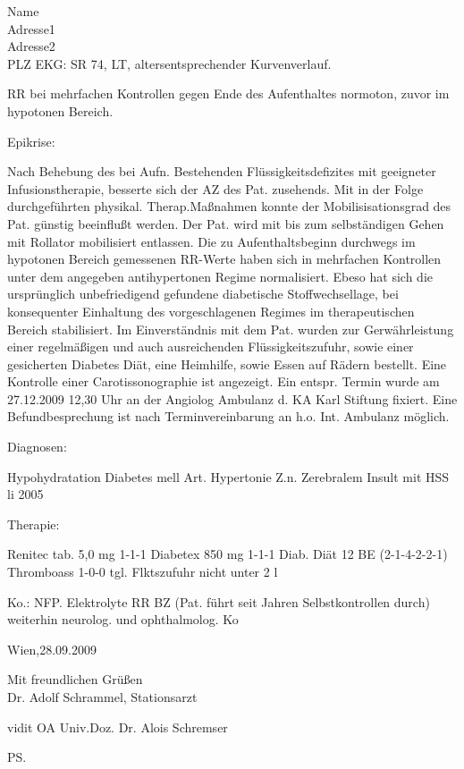 \documentclass[fromalign=center,fromrule=aftername,fromphone,fromemail,fontsize=10pt,DIV=13]{scrlttr2}
\begin{document}
\begin{letter}{Name\\
Adresse1\\
Adresse2\\
PLZ}
EKG: SR 74, LT, altersentsprechender Kurvenverlauf.

RR bei mehrfachen Kontrollen gegen Ende des Aufenthaltes normoton, zuvor im hypotonen Bereich.

Epikrise:

Nach Behebung des bei Aufn. Bestehenden Flüssigkeitsdefizites mit geeigneter Infusionstherapie, besserte sich der AZ des Pat. zusehends. Mit in der Folge durchgeführten physikal. Therap.Maßnahmen konnte der Mobilisisationsgrad des Pat. günstig beeinflußt werden. Der Pat. wird mit bis zum selbständigen Gehen mit Rollator mobilisiert entlassen. Die zu Aufenthaltsbeginn durchwegs im hypotonen Bereich gemessenen RR-Werte haben sich in mehrfachen Kontrollen unter dem angegeben antihypertonen Regime normalisiert. Ebeso hat sich die ursprünglich unbefriedigend gefundene diabetische Stoffwechsellage, bei konsequenter Einhaltung des vorgeschlagenen Regimes im therapeutischen Bereich stabilisiert. Im Einverständnis mit dem Pat. wurden zur Gerwährleistung einer regelmäßigen und auch ausreichenden Flüssigkeitszufuhr, sowie einer gesicherten Diabetes Diät, eine Heimhilfe, sowie Essen auf Rädern bestellt. Eine Kontrolle  einer Carotissonographie ist angezeigt. Ein entspr. Termin wurde am 27.12.2009  12,30 Uhr an der Angiolog Ambulanz d. KA Karl Stiftung fixiert. Eine Befundbesprechung ist nach Terminvereinbarung an h.o. Int. Ambulanz möglich.


 Diagnosen:

Hypohydratation 
Diabetes mell 
Art. Hypertonie
Z.n. Zerebralem Insult mit HSS li 2005

Therapie:

Renitec tab. 5,0 mg 1-1-1
Diabetex 850 mg 1-1-1
Diab. Diät 12 BE (2-1-4-2-2-1)
Thromboass 1-0-0
tgl. Flktszufuhr nicht unter 2 l

Ko.:
NFP.  Elektrolyte RR BZ (Pat. führt seit Jahren Selbstkontrollen durch)
weiterhin neurolog. und ophthalmolog. Ko

                                                                                                     Wien,28.09.2009

\closing{Mit freundlichen Grüßen\vspace{2em}\\ Dr. Adolf Schrammel, Stationsarzt}



vidit OA Univ.Doz. Dr. Alois Schremser

\ps
{}

\end{letter}
\end{document}
